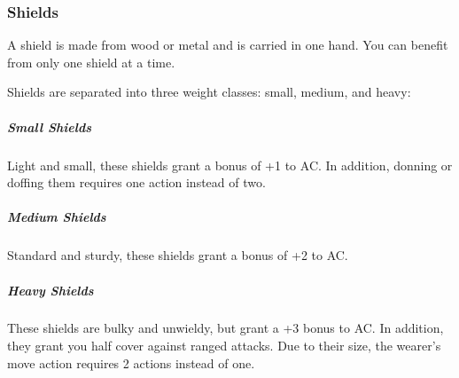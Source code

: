 \subsubsection{Shields} \label{ssec::shields}
    A shield is made from wood or metal and is carried in one hand.
    You can benefit from only one shield at a time.

    Shields are separated into three weight classes: small, medium, and heavy:
    \subparagraph{Small Shields}
        Light and small, these shields grant a bonus of +1 to AC.
        In addition, donning or doffing them requires one action instead of two.
    \subparagraph{Medium Shields}
        Standard and sturdy, these shields grant a bonus of +2 to AC.
    \subparagraph{Heavy Shields}
        These shields are bulky and unwieldy, but grant a +3 bonus to AC.
        In addition, they grant you half cover against ranged attacks.
        Due to their size, the wearer's move action requires 2 actions instead of one.

